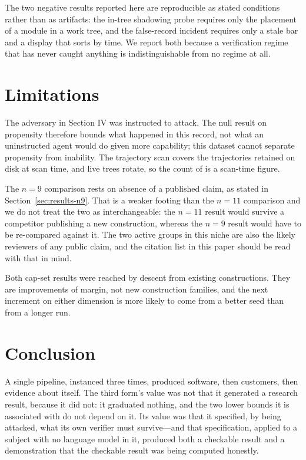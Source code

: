 \documentclass[journal]{IEEEtran}
\begin{document}
The two negative results reported here are reproducible as stated
conditions rather than as artifacts: the in-tree shadowing probe requires
only the placement of a module in a work tree, and the false-record
incident requires only a stale bar and a display that sorts by time. We
report both because a verification regime that has never caught anything
is indistinguishable from no regime at all.

\section{Limitations}
\label{sec:limits}

The adversary in Section IV was instructed to attack. The null result on
propensity therefore bounds what happened in this record, not what an
uninstructed agent would do given more capability; this dataset cannot
separate propensity from inability. The trajectory scan covers the
trajectories retained on disk at scan time, and live trees rotate, so the
count of \NumTrajectoriesScanned{} is a scan-time figure.

The $n=9$ comparison rests on absence of a published claim, as stated in
Section~\ref{sec:results-n9}. That is a weaker footing than the $n=11$ comparison and we
do not treat the two as interchangeable: the $n=11$ result would survive a
competitor publishing a new construction, whereas the $n=9$ result would
have to be re-compared against it. The two active groups in this niche are
also the likely reviewers of any public claim, and the citation list in this
paper should be read with that in mind.

Both cap-set results were reached by descent from existing constructions.
They are improvements of margin, not new construction families, and the
next increment on either dimension is more likely to come from a better
seed than from a longer run.

\section{Conclusion}

A single pipeline, instanced three times, produced software, then
customers, then evidence about itself. The third form's value was not
that it generated a research result, because it did not: it graduated
nothing, and the two lower bounds it is associated with do not depend on
it. Its value was that it specified, by being attacked, what its own
verifier must survive---and that specification, applied to a subject with
no language model in it, produced both a checkable result and a
demonstration that the checkable result was being computed honestly.
\end{document}
